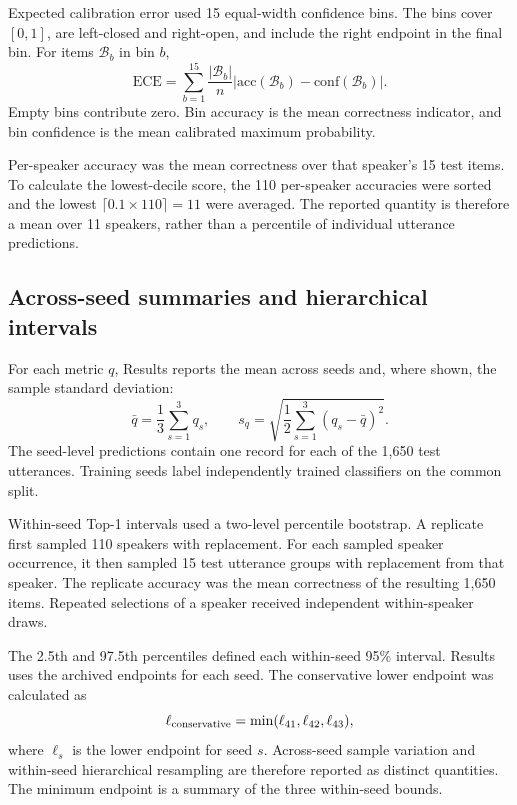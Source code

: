 Expected calibration error used 15 equal-width confidence bins. The bins cover $[0,1]$, are left-closed and right-open, and include the right endpoint in the final bin. For items $\mathcal B_b$ in bin $b$,
\begin{equation}
 \mathrm{ECE}
 =\sum_{b=1}^{15}\frac{|\mathcal B_b|}{n}
       \left|\mathrm{acc}(\mathcal B_b)
             -\mathrm{conf}(\mathcal B_b)\right|.
 \label{eq:sv2-ece}
\end{equation}
Empty bins contribute zero. Bin accuracy is the mean correctness indicator, and bin confidence is the mean calibrated maximum probability.

Per-speaker accuracy was the mean correctness over that speaker's 15 test items. To calculate the lowest-decile score, the 110 per-speaker accuracies were sorted and the lowest $\lceil0.1\times110\rceil=11$ were averaged. The reported quantity is therefore a mean over 11 speakers, rather than a percentile of individual utterance predictions.

\subsection{Across-seed summaries and hierarchical intervals}
For each metric $q$, Results reports the mean across seeds and, where shown, the sample standard deviation:
\begin{equation}
 \bar q=\frac{1}{3}\sum_{s=1}^{3}q_s,
 \qquad
 s_q=\sqrt{\frac{1}{2}\sum_{s=1}^{3}(q_s-\bar q)^2}.
 \label{eq:sv2-seeds}
\end{equation}
The seed-level predictions contain one record for each of the 1,650 test utterances. Training seeds label independently trained classifiers on the common split.

Within-seed Top-1 intervals used a two-level percentile bootstrap. A replicate first sampled 110 speakers with replacement. For each sampled speaker occurrence, it then sampled 15 test utterance groups with replacement from that speaker. The replicate accuracy was the mean correctness of the resulting 1,650 items. Repeated selections of a speaker received independent within-speaker draws.

The 2.5th and 97.5th percentiles defined each within-seed 95\% interval. Results uses the archived endpoints for each seed. The conservative lower endpoint was calculated as
\begin{equation}
 \ell_{\rm conservative}=\min(\ell_{41},\ell_{42},\ell_{43}),
 \label{eq:sv2-conservative}
\end{equation}
where $\ell_s$ is the lower endpoint for seed $s$. Across-seed sample variation and within-seed hierarchical resampling are therefore reported as distinct quantities. The minimum endpoint is a summary of the three within-seed bounds.

